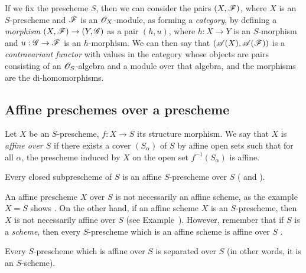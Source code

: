 \begin{env}[1.1.3]
\label{II.1.1.3}
If we fix the prescheme $S$, then we can consider the pairs $(X,\mathscr{F})$, where $X$ is an $S$-prescheme and $\mathscr{F}$ is an $\mathscr{O}_X$-module, as forming a \emph{category}, by defining a \emph{morphism} $(X,\sh{F})\to(Y,\sh{G})$ as a pair $(h,u)$, where $h:X\to Y$ is an $S$-morphism and $u:\sh{G}\to\sh{F}$ is an $h$-morphism.
We can then say that $(\mathscr{A}(X),\mathscr{A}(\mathscr{F}))$ is a \emph{contravariant functor} with values in the category whose objects are pairs consisting of an $\mathscr{O}_S$-algebra and a module over that algebra, and the morphisms are the di-homomorphisms.
\end{env}

\subsection{Affine preschemes over a prescheme}
\label{subsection:II.1.2}

\begin{definition}[1.2.1]
\label{II.1.2.1}
Let $X$ be an $S$-prescheme, $f:X\to S$ its structure morphism.
We say that $X$ is \emph{affine over $S$} if there exists a cover $(S_\alpha)$ of $S$ by affine open sets such that for all $\alpha$, the prescheme induced by $X$ on the open set $f^{-1}(S_\alpha)$ is affine.
\end{definition}

\begin{example}[1.2.2]
\label{II.1.2.2}
Every closed subprescheme of $S$ is an affine $S$-prescheme over $S$ ( and ).
\end{example}

\begin{remark}[1.2.3]
\label{II.1.2.3}
An affine prescheme $X$ over $S$ is not necessarily an affine scheme, as the example $X=S$ shows .
On the other hand, if an affine scheme $X$ is an $S$-prescheme, then $X$ is not necessarily affine over
$S$ (see Example~).
However, remember that if $S$ is a \emph{scheme}, then every $S$-prescheme which is an affine scheme is affine over $S$ .
\end{remark}

\begin{proposition}[1.2.4]
\label{II.1.2.4}
Every $S$-prescheme which is affine over $S$ is separated over $S$ (in other words, it is an $S$-scheme).
\end{proposition}

